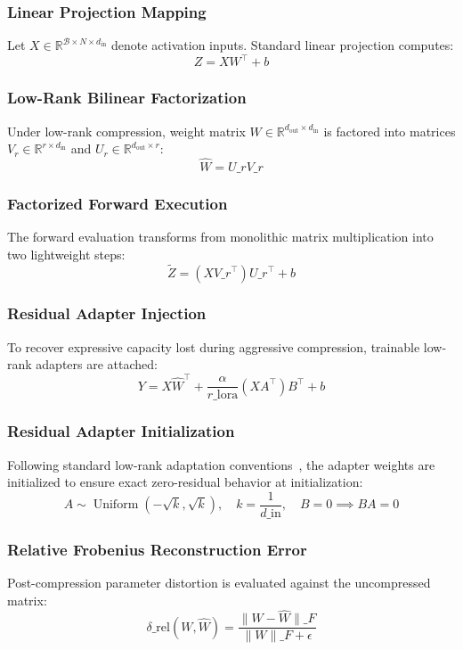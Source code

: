 \subsubsection{Linear Projection Mapping}
Let $X \in \mathbb{R}^{\mathcal{B} \times N \times d_{\text{in}}}$ denote activation inputs. Standard linear projection computes:
\[
Z = X W^\top + b
\]

\subsubsection{Low-Rank Bilinear Factorization}
Under low-rank compression, weight matrix $W \in \mathbb{R}^{d_{\text{out}} \times d_{\text{in}}}$ is factored into matrices $V_r \in \mathbb{R}^{r \times d_{\text{in}}}$ and $U_r \in \mathbb{R}^{d_{\text{out}} \times r}$:
\[
\hat{W} = U\_r V\_r
\]

\subsubsection{Factorized Forward Execution}
The forward evaluation transforms from monolithic matrix multiplication into two lightweight steps:
\[
\tilde{Z} = (X V\_r^\top) U\_r^\top + b
\]

\subsubsection{Residual Adapter Injection}
To recover expressive capacity lost during aggressive compression, trainable low-rank adapters are attached:
\[
Y = X \hat{W}^\top + \frac{\alpha}{r\_{\text{lora}}} (X A^\top) B^\top + b
\]

\subsubsection{Residual Adapter Initialization}
Following standard low-rank adaptation conventions~\citep{hu2022lora}, the adapter weights are initialized to ensure exact zero-residual behavior at initialization:
\[
A \sim \operatorname{Uniform}(-\sqrt{k}, \sqrt{k}), \quad k = \frac{1}{d\_{\text{in}}}, \quad B = 0 \implies B A = 0
\]

\subsubsection{Relative Frobenius Reconstruction Error}
Post-compression parameter distortion is evaluated against the uncompressed matrix:
\[
\delta\_{\text{rel}}(W, \hat{W}) = \frac{\|W - \hat{W}\|\_F}{\|W\|\_F + \epsilon}
\]

